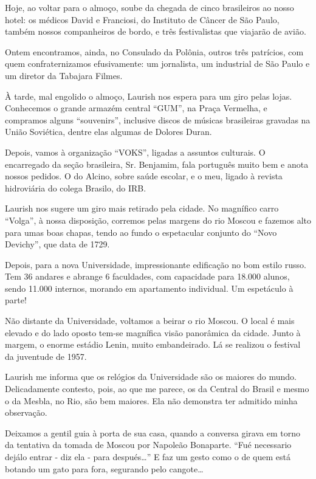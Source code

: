 Hoje, ao voltar para o almoço, soube da chegada de cinco brasileiros ao nosso hotel: os médicos David e Franciosi, do Instituto de Câncer de São Paulo, também nossos companheiros de bordo, e três festivalistas que viajarão de avião.

Ontem encontramos, ainda, no Consulado da Polônia, outros três patrícios, com quem confraternizamos efusivamente: um jornalista, um industrial de São Paulo e um diretor da Tabajara Filmes.

À tarde, mal engolido o almoço, Laurish nos espera para um giro pelas lojas. Conhecemos o grande armazém central “GUM”, na Praça Vermelha, e compramos alguns “souvenirs”, inclusive discos de músicas brasileiras gravadas na União Soviética, dentre elas algumas de Dolores Duran.

Depois, vamos à organização “VOKS”, ligadas a assuntos culturais. O encarregado da seção brasileira, Sr. Benjamim, fala português muito bem e anota nossos pedidos. O do Alcino, sobre saúde escolar, e o meu, ligado à revista hidroviária do colega Brasilo, do IRB.

Laurish nos sugere um giro mais retirado pela cidade. No magnífico carro “Volga”, à nossa disposição, corremos pelas margens do rio Moscou e fazemos alto para umas boas chapas, tendo ao fundo o espetacular conjunto do “Novo Devichy”, que data de 1729.

Depois, para a nova Universidade, impressionante edificação no bom estilo russo. Tem 36 andares e abrange 6 faculdades, com capacidade para 18.000 alunos, sendo 11.000 internos, morando em apartamento individual. Um espetáculo à parte!

Não distante da Universidade, voltamos a beirar o rio Moscou. O local é mais elevado e do lado oposto tem-se magnífica visão panorâmica da cidade. Junto à margem, o enorme estádio Lenin, muito embandeirado. Lá se realizou o festival da juventude de 1957.

Laurish me informa que os relógios da Universidade são os maiores do mundo. Delicadamente contesto, pois, ao que me parece, os da Central do Brasil e mesmo o da Mesbla, no Rio, são bem maiores. Ela não demonstra ter admitido minha observação.

Deixamos a gentil guia à porta de sua casa, quando a conversa girava em torno da tentativa da tomada de Moscou por Napoleão Bonaparte. “Fué necessario dejálo entrar - diz ela - para después\ldots” E faz um gesto como o de quem está botando um gato para fora, segurando pelo cangote\ldots

